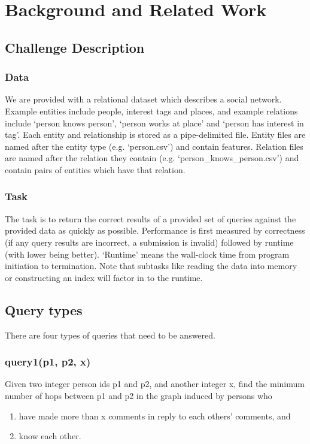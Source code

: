 \documentclass{article}
\begin{document}
\section{Background and Related Work}
\subsection{Challenge Description}

\subsubsection{Data}
We are provided with a relational dataset which describes a social
network.  Example entities include people, interest tags and places, 
and example relations include `person knows person', `person works at place'
and `person has interest in tag'.  Each entity and
relationship is stored as a pipe-delimited file.  Entity files are
named after the entity type (e.g. `person.csv') and contain features.
Relation files are named after the relation they contain
(e.g. `person\_knows\_person.csv') and contain pairs of entities which
have that relation.

\subsubsection{Task}
The task is to return the correct results of a provided set of queries
against the provided data as quickly as possible.  Performance is
first measured by correctness (if any query results are incorrect, a
submission is invalid) followed by runtime (with lower being better).
`Runtime' means the wall-clock time from program initiation to
termination.  Note that subtasks like reading the data into memory or
constructing an index will factor in to the runtime.

\subsection{Query types}
There are four types of queries that need to be answered.

\subsubsection{query1(p1, p2, x)}
Given two integer person ids p1 and p2, and another integer x, find
the minimum number of hops between p1 and p2 in the graph induced by
persons who
\begin{enumerate}
\item have made more than x comments in reply to each others'
comments, and
\item know each other.
\end{enumerate}
\end{document}
